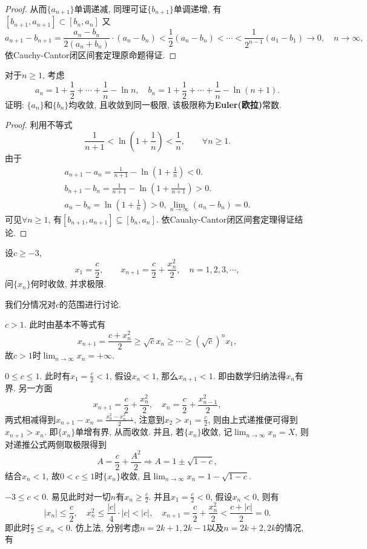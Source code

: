 \begin{quiza}
\begin{proof}
从而\(\{a_{n+1}\}\)单调递减, 同理可证\(\{b_{n+1}\}\)单调递增, 有\([b_{n+1},a_{n+1}]\subset [b_{n},a_{n}]\) 又\[a_{n+1}-b_{n+1}=\frac{a_n-b_n}{2(a_n+b_n)}\cdot(a_n-b_n)<\frac{1}{2}(a_n-b_n)<\cdots<\frac{1}{2^{n-1}}(a_1-b_1)\rightarrow 0,\quad n\rightarrow\infty,\]依Cauchy-Cantor闭区间套定理原命题得证.
\end{proof}
\woe 对于\(n\geqslant 1\), 考虑\[a_n=1+\frac{1}{2}+\cdots+\frac{1}{n}-\ln n,\quad b_n=1+\frac{1}{2}+\cdots+\frac{1}{n}-\ln(n+1).\]
证明: \(\{a_n\}\)和\(\{b_n\}\)均收敛, 且收敛到同一极限, 该极限称为\textbf{Euler(欧拉)}常数.
\begin{proof}
利用不等式\[\frac{1}{n+1}<\ln\left(1+\frac{1}{n}\right)<\frac{1}{n},\qquad\forall n\geqslant 1.\]由于
    \begin{gather*}
      a_{n+1}-a_{n}=\frac{1}{n+1}-\ln\left(1+\frac{1}{n}\right)<0.\\
      b_{n+1}-b_{n}=\frac{1}{n+1}-\ln\left(1+\frac{1}{n+1}\right)>0.\\
      a_n-b_n=\ln\left(1+\frac{1}{n}\right)>0, \lim_{n\rightarrow\infty}(a_n-b_n)=0.
    \end{gather*}
可见\(\forall n\geqslant 1\), 有\([b_{n+1},a_{n+1}]\subseteq [b_n,a_n]\). 依Cauahy-Cantor闭区间套定理得证结论.
\end{proof}
\woe 设\(c\geqslant -3\), \[x_1=\frac{c}{2},\qquad x_{n+1}=\frac{c}{2}+\frac{x_n^2}{2},\quad n=1,2,3,\cdots,\]问\(\{x_n\}\)何时收敛, 并求极限.
\begin{solution}
我们分情况对\(c\)的范围进行讨论.
\begin{asparaenum}[\bfseries (i)]
\item \(c> 1\). 此时由基本不等式有\[x_{n+1}=\frac{c+x_n^2}{2}\geqslant\sqrt{c}x_n\geqslant\cdots\geqslant \left(\sqrt{c}\right)^nx_1,\]
故\(c>1\)时\(\lim_{n\rightarrow\infty}x_n=+\infty\).
\item \(0\leqslant c\leqslant 1\). 此时有\(x_1=\frac{c}{2}<1\), 假设\(x_n<1\), 那么\(x_{n+1}<1\). 即由数学归纳法得\(x_n\)有界. 另一方面\[x_{n+1}=\frac{c}{2}+\frac{x_n^2}{2},\quad x_n=\frac{c}{2}+\frac{x_{n-1}^2}{2},\]两式相减得到\(x_{n+1}-x_{n}=\frac{x_n^2-x_{n-1}^2}{2}\), 注意到\(x_2>x_1=\frac{c}{2}\), 则由上式递推便可得到\(x_{n+1}>x_n\). 即\(\{x_n\}\)单增有界, 从而收敛. 并且, 若\(\{x_n\}\)收敛, 记\(\lim_{n\rightarrow\infty}x_n=X\), 则对递推公式两侧取极限得到\[A=\frac{c}{2}+\frac{A^2}{2}\Rightarrow A=1\pm\sqrt{1-c},\]结合\(x_n<1\), 故\(0<c\leqslant 1\)时\(\{x_n\}\)收敛, 且\(\lim_{n\rightarrow\infty}x_n=1-\sqrt{1-c}.\)
\item \label{c2x2f}\(-3\leqslant c< 0\). 易见此时对一切\(n\)有\(x_n\geqslant\frac{c}{2}\). 并且\(x_1=\frac{c}{2}<0\), 假设\(x_n<0\), 则有\[\left|x_n\right|\leqslant\frac{c}{2},\quad x_n^2\leqslant\frac{\left|c\right|}{4}\cdot|c|<|c|,\quad x_{n+1}=\frac{c}{2}+\frac{x_n^2}{2}<\frac{c+|c|}{2}=0.\]即此时\(\frac{c}{2}\leqslant x_n<0\). 仿上法, 分别考虑\(n=2k+1,2k-1\)以及\(n=2k+2,2k\)的情况, 有\begin{align}

\end{align}
\end{asparaenum}
\end{solution}
\end{quiza}
